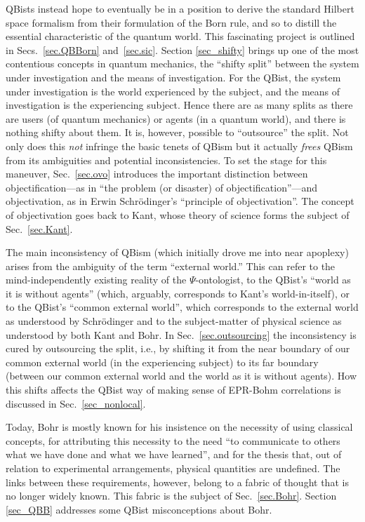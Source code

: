\documentclass[smallextended]{svjour3}
\begin{document}
QBists instead hope to eventually be in a position to derive the standard Hilbert space formalism from their formulation of the Born rule, and so to distill the essential characteristic of the quantum world. This fascinating project is outlined in Secs.~\ref{sec.QBBorn} and~\ref{sec.sic}. Section \ref{sec_shifty} brings up one of the most contentious concepts in quantum mechanics, the ``shifty split''\cite{Bell90} between the system under investigation and the means of investigation. For the QBist, the system under investigation is the world experienced by the subject, and the means of investigation is the experiencing subject. Hence there are as many splits as there are users (of quantum mechanics) or agents (in a quantum world), and there is nothing shifty about them. It is, however, possible to ``outsource'' the split. Not only does this \emph{not} infringe the basic tenets of QBism but it actually \emph{frees} QBism from its ambiguities and potential inconsistencies. To set the stage for this maneuver, Sec.~\ref{sec.ovo} introduces the important distinction between objectification---as in ``the problem (or disaster\cite{vF1990}) of objectification''---and objectivation, as in Erwin Schr\"odinger's ``principle of objectivation''.\cite{SchrLifeMindMatter1} The concept of objectivation goes back to Kant, whose theory of science forms the subject of Sec.~\ref{sec.Kant}. 

The main inconsistency of QBism (which initially drove me into near apoplexy) arises from the ambiguity of the term ``external world.'' This can refer to the mind-independently existing reality of the $\Psi$-ontologist, to the QBist's ``world as it is without agents''\cite{FSinQSE} (which, arguably, corresponds to Kant's world-in-itself), or to the QBist's ``common external world'',\cite{FMS2014} which corresponds to the external world as understood by Schr\"odinger and to the subject-matter of physical science as understood by both Kant and Bohr. In Sec.~\ref{sec.outsourcing} the inconsistency is cured by outsourcing the split, i.e., by shifting it from the near boundary of our common external world (in the experiencing subject) to its far boundary (between our common external world and the world as it is without agents). How this shifts affects the QBist way of making sense of EPR-Bohm correlations\cite{EPR,Bohm51} is discussed in Sec.~\ref{sec_nonlocal}.

Today, Bohr is mostly known for his insistence on the necessity of using classical concepts, for attributing this necessity to the need  ``to communicate to others what we have done and what we have learned'',\cite{Bohr-EAPHK,Bohr-APHK} and for the thesis that, out of relation to experimental arrangements, physical quantities are undefined. The links between these requirements, however, belong to a fabric of thought that is no longer widely known. This fabric is the subject of Sec.~\ref{sec.Bohr}. Section \ref{sec_QBB} addresses some QBist misconceptions about Bohr.
\end{document}
